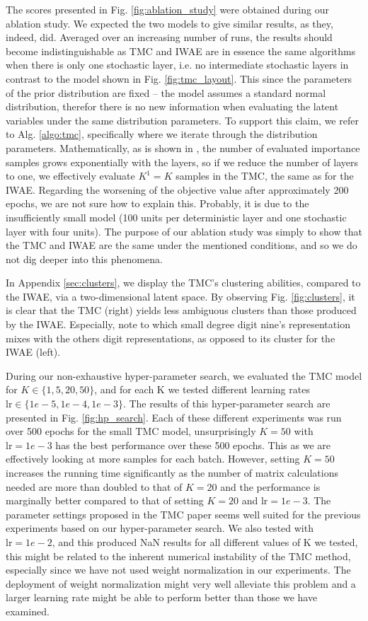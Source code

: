 \documentclass{article}
\begin{document}
The scores presented in Fig. \ref{fig:ablation_study} were obtained during our ablation study. We expected the two models to give similar results, as they, indeed, did. Averaged over an increasing number of runs, the results should become indistinguishable as TMC and IWAE are in essence the same algorithms when there is only one stochastic layer, i.e. no intermediate stochastic layers in contrast to the model shown in Fig. \ref{fig:tmc_layout}. This since the parameters of the prior distribution are fixed – the model assumes a standard normal distribution, therefor there is no new information when evaluating the latent variables under the same distribution parameters. To support this claim, we refer to Alg. \ref{algo:tmc}, specifically where we iterate through the distribution parameters. Mathematically, as is shown in \cite{tmc}, the number of evaluated importance samples grows exponentially with the layers, so if we reduce the number of layers to one, we effectively evaluate $K^1=K$ samples in the TMC, the same as for the IWAE. Regarding the worsening of the objective value after approximately 200 epochs, we are not sure how to explain this. Probably, it is due to the insufficiently small model (100 units per deterministic layer and one stochastic layer with four units). The purpose of our ablation study was simply to show that the TMC and IWAE are the same under the mentioned conditions, and so we do not dig deeper into this phenomena.

In Appendix \ref{sec:clusters}, we display the TMC's clustering abilities, compared to the IWAE, via a two-dimensional latent space. By observing Fig. \ref{fig:clusters}, it is clear that the TMC (right) yields less ambiguous clusters than those produced by the IWAE. Especially, note to which small degree digit nine's representation mixes with the others digit representations, as opposed to its cluster for the IWAE (left).

During our non-exhaustive hyper-parameter search, we evaluated the TMC model for $K\in\{1, 5, 20, 50\}$, and for each K we tested different learning rates $\text{lr}\in\{1e-5, 1e-4, 1e-3\}$. The results of this hyper-parameter search are presented in Fig. \ref{fig:hp_search}. Each of these different experiments was run over 500 epochs for the small TMC model, unsurprisingly $K=50$ with $\text{lr}=1e-3$ has the best performance over these 500 epochs. This as we are effectively looking at more samples for each batch. However, setting $K=50$ increases the running time significantly as the number of matrix calculations needed are more than doubled to that of $K=20$ and the performance is marginally better compared to that of setting $K=20$ and $\text{lr}=1e-3$. The parameter settings proposed in the TMC paper seems well suited for the previous experiments based on our hyper-parameter search. We also tested with $\text{lr}=1e-2$, and this produced NaN results for all different values of K we tested, this might be related to the inherent numerical instability of the TMC method, especially since we have not used weight normalization in our experiments. The deployment of weight normalization might very well alleviate this problem and a larger learning rate might be able to perform better than those we have examined. 
\end{document}
